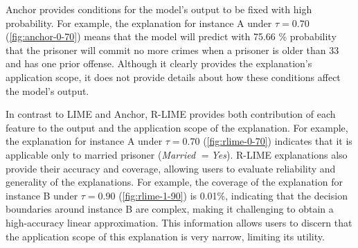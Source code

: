 \documentclass[runningheads]{llncs}
\begin{document}
Anchor provides conditions for the model's output to be fixed with high
probability.
For example,
the explanation for instance A under $\tau=0.70$
(\cref{fig:anchor-0-70})
means that the model will predict with 75.66 \% probability
that the prisoner will commit no more crimes
when a prisoner is older than 33 and has one prior offense.
Although it clearly provides the explanation's application scope,
it does not provide details about how these conditions affect the model's output.

In contrast to LIME and Anchor,
R-LIME provides both contribution of each feature to the output and
the application scope of the explanation.
For example, the explanation for instance A
under $\tau=0.70$ (\cref{fig:rlime-0-70}) indicates that it is applicable
only to married prisoner (\emph{Married} $=$\emph{Yes}).
R-LIME explanations also provide their accuracy and coverage,
allowing users to evaluate reliability and generality of the explanations.
For example, the coverage of the explanation for instance B under $\tau=0.90$
(\cref{fig:rlime-1-90}) is 0.01\%,
indicating that the decision boundaries around instance B are complex,
making it challenging to obtain a high-accuracy linear approximation.
This information allows users to discern that
the application scope of this explanation is very narrow, limiting its utility.
\end{document}
